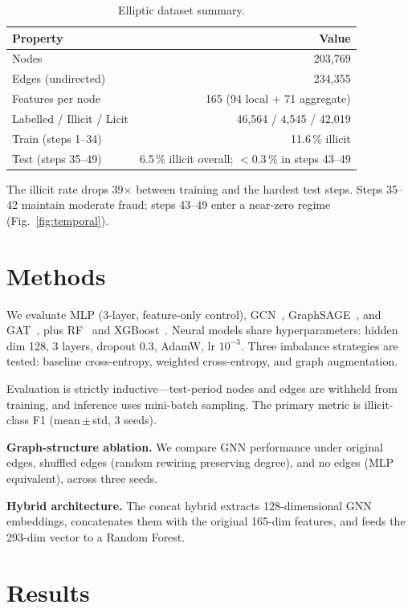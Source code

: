 \documentclass[runningheads]{llncs}
\begin{document}
\begin{table}[!htbp]
\centering
\caption{Elliptic dataset summary.}
\label{tab:dataset}
\small
\begin{tabular}{lr}
\toprule
\textbf{Property} & \textbf{Value} \\
\midrule
Nodes & 203,769 \\
Edges (undirected) & 234,355 \\
Features per node & 165 (94 local + 71 aggregate) \\
Labelled / Illicit / Licit & 46,564 / 4,545 / 42,019 \\
Train (steps 1--34) & 11.6\,\% illicit \\
Test (steps 35--49) & 6.5\,\% illicit overall; $<$0.3\,\% in steps 43--49 \\
\bottomrule
\end{tabular}
\end{table}

The illicit rate drops 39$\times$ between training and the hardest test
steps.  Steps 35--42 maintain moderate fraud; steps 43--49 enter a
near-zero regime (Fig.~\ref{fig:temporal}).

\section{Methods}

We evaluate MLP (3-layer, feature-only control),
GCN~\citep{kipf2017}, GraphSAGE~\citep{hamilton2017}, and
GAT~\citep{velickovic2018}, plus RF~\citep{breiman2001rf} and
XGBoost~\citep{chen2016xgboost}.  Neural models share hyperparameters:
hidden dim 128, 3 layers, dropout 0.3, AdamW, lr $10^{-3}$.  Three
imbalance strategies are tested: baseline cross-entropy, weighted
cross-entropy, and graph augmentation.

Evaluation is strictly inductive---test-period nodes and edges are
withheld from training, and inference uses mini-batch sampling.  The
primary metric is illicit-class F1 (mean\,$\pm$\,std, 3 seeds).

\textbf{Graph-structure ablation.}  We compare GNN performance under
original edges, shuffled edges (random rewiring preserving degree), and
no edges (MLP equivalent), across three seeds.

\textbf{Hybrid architecture.}  The concat hybrid extracts
128-dimensional GNN embeddings, concatenates them with the original
165-dim features, and feeds the 293-dim vector to a Random Forest.

\section{Results}
\end{document}
